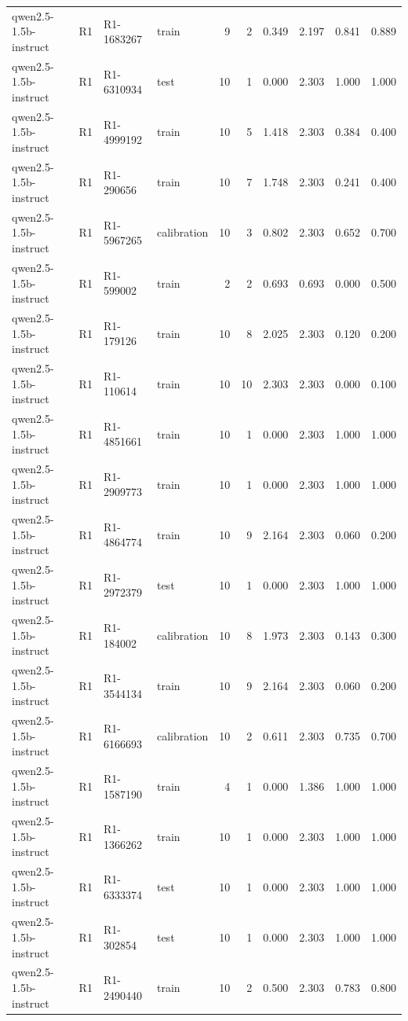 \begin{table}
\begin{tabular}{llllrrrrrr}
qwen2.5-1.5b-instruct & R1 & R1-1683267 & train & 9 & 2 & 0.349 & 2.197 & 0.841 & 0.889 \\
qwen2.5-1.5b-instruct & R1 & R1-6310934 & test & 10 & 1 & 0.000 & 2.303 & 1.000 & 1.000 \\
qwen2.5-1.5b-instruct & R1 & R1-4999192 & train & 10 & 5 & 1.418 & 2.303 & 0.384 & 0.400 \\
qwen2.5-1.5b-instruct & R1 & R1-290656 & train & 10 & 7 & 1.748 & 2.303 & 0.241 & 0.400 \\
qwen2.5-1.5b-instruct & R1 & R1-5967265 & calibration & 10 & 3 & 0.802 & 2.303 & 0.652 & 0.700 \\
qwen2.5-1.5b-instruct & R1 & R1-599002 & train & 2 & 2 & 0.693 & 0.693 & 0.000 & 0.500 \\
qwen2.5-1.5b-instruct & R1 & R1-179126 & train & 10 & 8 & 2.025 & 2.303 & 0.120 & 0.200 \\
qwen2.5-1.5b-instruct & R1 & R1-110614 & train & 10 & 10 & 2.303 & 2.303 & 0.000 & 0.100 \\
qwen2.5-1.5b-instruct & R1 & R1-4851661 & train & 10 & 1 & 0.000 & 2.303 & 1.000 & 1.000 \\
qwen2.5-1.5b-instruct & R1 & R1-2909773 & train & 10 & 1 & 0.000 & 2.303 & 1.000 & 1.000 \\
qwen2.5-1.5b-instruct & R1 & R1-4864774 & train & 10 & 9 & 2.164 & 2.303 & 0.060 & 0.200 \\
qwen2.5-1.5b-instruct & R1 & R1-2972379 & test & 10 & 1 & 0.000 & 2.303 & 1.000 & 1.000 \\
qwen2.5-1.5b-instruct & R1 & R1-184002 & calibration & 10 & 8 & 1.973 & 2.303 & 0.143 & 0.300 \\
qwen2.5-1.5b-instruct & R1 & R1-3544134 & train & 10 & 9 & 2.164 & 2.303 & 0.060 & 0.200 \\
qwen2.5-1.5b-instruct & R1 & R1-6166693 & calibration & 10 & 2 & 0.611 & 2.303 & 0.735 & 0.700 \\
qwen2.5-1.5b-instruct & R1 & R1-1587190 & train & 4 & 1 & 0.000 & 1.386 & 1.000 & 1.000 \\
qwen2.5-1.5b-instruct & R1 & R1-1366262 & train & 10 & 1 & 0.000 & 2.303 & 1.000 & 1.000 \\
qwen2.5-1.5b-instruct & R1 & R1-6333374 & test & 10 & 1 & 0.000 & 2.303 & 1.000 & 1.000 \\
qwen2.5-1.5b-instruct & R1 & R1-302854 & test & 10 & 1 & 0.000 & 2.303 & 1.000 & 1.000 \\
qwen2.5-1.5b-instruct & R1 & R1-2490440 & train & 10 & 2 & 0.500 & 2.303 & 0.783 & 0.800 \\

\end{tabular}
\end{table}
